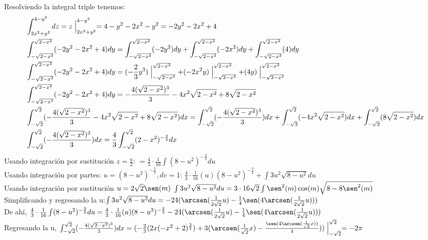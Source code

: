 \documentclass{article}
\begin{document}
\begin{enumerate}
{        Resolviendo la integral triple tenemos:
        \begin{align*}
            \displaystyle
            &\int_{2x^2+y^2}^{4-y^2}dz = z\Bigm|_{2x^2+y^2}^{4-y^2} = 4-y^2-2x^2-y^2 = -2y^2-2x^2+4\\
            &\int_{-\sqrt{2-x^2}}^{\sqrt{2-x^2}} (-2y^2-2x^2+4)dy = \int_{-\sqrt{2-x^2}}^{\sqrt{2-x^2}} (-2y^2)dy +  \int_{-\sqrt{2-x^2}}^{\sqrt{2-x^2}} (-2x^2)dy + \int_{-\sqrt{2-x^2}}^{\sqrt{2-x^2}} (4)dy\\
            &\int_{-\sqrt{2-x^2}}^{\sqrt{2-x^2}} (-2y^2-2x^2+4)dy = (-\frac{2}{3}y^3)\Bigm|_{-\sqrt{2-x^2}}^{\sqrt{2-x^2}} + (-2x^2y)\Bigm|_{-\sqrt{2-x^2}}^{\sqrt{2-x^2}} + (4y)\Bigm|_{-\sqrt{2-x^2}}^{\sqrt{2-x^2}}\\
            &\int_{-\sqrt{2-x^2}}^{\sqrt{2-x^2}} (-2y^2-2x^2+4)dy = -\frac{4(\sqrt{2-x^2})^3}{3} -4x^2\sqrt{2-x^2} + 8\sqrt{2-x^2}\\
            &\int_{-\sqrt{2}}^{\sqrt{2}}(-\frac{4(\sqrt{2-x^2})^3}{3} -4x^2\sqrt{2-x^2} + 8\sqrt{2-x^2})dx = \int_{-\sqrt{2}}^{\sqrt{2}}(-\frac{4(\sqrt{2-x^2})^3}{3})dx + \int_{-\sqrt{2}}^{\sqrt{2}}(-4x^2\sqrt{2-x^2})dx+ \int_{-\sqrt{2}}^{\sqrt{2}}(8\sqrt{2-x^2})dx\\
            &\int_{-\sqrt{2}}^{\sqrt{2}}(-\frac{4(\sqrt{2-x^2})^3}{3})dx = \frac{4}{3}\int_{-\sqrt{2}}^{\sqrt{2}}(2-x^2)^{-\frac{3}{2}} dx
        \end{align*}
        Usando integración por sustitución $z = \frac{u}{2}$:
        $= \frac{4}{3}\cdot\frac{1}{16}\int(8-u^2)^{-\frac{3}{2}} du $\\
        Usando integración por partes: $u = (8-u^2)^{-\frac{3}{2}} , dv = 1$:
        $\frac{4}{3}\cdot\frac{1}{16}(u)(8-u^2)^{-\frac{3}{2}} + \int3u^2\sqrt{8-u^2}du$\\
        Usando integración por sustitución $u = 2\sqrt{2}\sen(m)$ $\int3u^2\sqrt{8-u^2}du = 3 \cdot 16\sqrt{2} \int \sen^2(m)\cos(m)\sqrt{8-8\sen^2(m)}$\\
        Simplificando y regresando la u:$\int3u^2\sqrt{8-u^2}du = -24(\arcsen(\frac{1}{2\sqrt{2}}u) - \frac{1}{4}\sen(4\arcsen(\frac{1}{2\sqrt{2}}u)))$\\
        De ahí, $\frac{4}{3}\cdot\frac{1}{16}\int(8-u^2)^{-\frac{3}{2}} du = \frac{4}{3}\cdot\frac{1}{16}(u)(8-u^2)^{-\frac{3}{2}} -24(\arcsen(\frac{1}{2\sqrt{2}}u) - \frac{1}{4}\sen(4\arcsen(\frac{1}{2\sqrt{2}}u)))$\\
        Regresando la u, $\int_{-\sqrt{2}}^{\sqrt{2}}(-\frac{4(\sqrt{2-x^2})^3}{3})dx = (-\frac{2}{3}(2x(-x^2 +2)^{\frac{3}{2}}) + 3(\arcsen(\frac{1}{\sqrt{2}}x) - \frac{\sen(4\arcsen(\frac{1}{\sqrt{2}}x))}{4}))\Bigm|_{-\sqrt{2}}^{\sqrt{2}} = -2\pi$\\

}
\end{enumerate}
\end{document}
